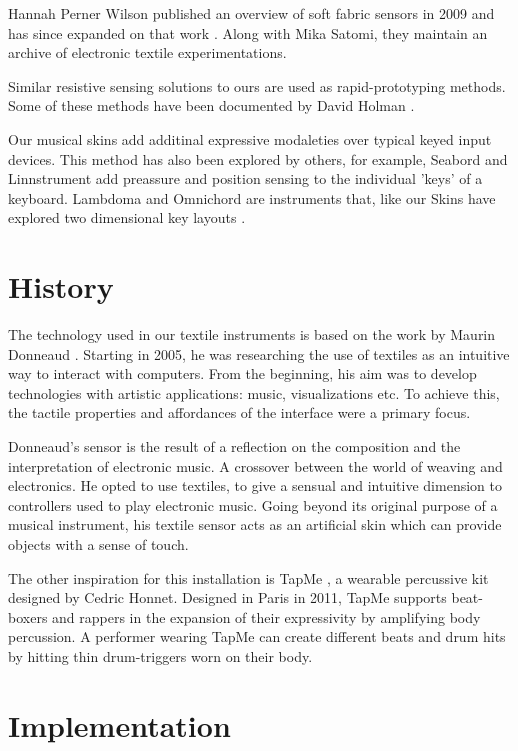 \documentclass{sigchi-ext}
\begin{document}
Hannah Perner Wilson published an overview of soft fabric sensors in 2009 \cite{perner-wilson:09} and has since expanded on that work \cite{perner-wilson:10}. Along with Mika Satomi, they maintain an archive of electronic textile experimentations\cite{kobakant}.

Similar resistive sensing solutions to ours are used as rapid-prototyping methods. Some of these methods have been documented by David Holman \cite{holman:14, holman:11}.

Our musical skins add additinal expressive modaleties over typical keyed input devices. This method has also been explored by others, for example, Seabord and Linnstrument \cite{seaboard, linnstrument} add preassure and position sensing to the individual 'keys' of a keyboard. Lambdoma and Omnichord are instruments that, like our Skins have explored two dimensional key layouts \cite{lambdoma, omnichord}.


\section{History}
The technology used in our textile instruments is based on the work by Maurin Donneaud \cite{donneaud}. Starting in 2005, he was researching the use of textiles as an intuitive way to interact with computers. From the beginning, his aim was to develop technologies with artistic applications: music, visualizations etc. To achieve this, the tactile properties and affordances of the interface were a primary focus.

Donneaud's sensor is the result of a reflection on the composition and the interpretation of electronic music. A crossover between the world of weaving and electronics. He opted to use textiles, to give a sensual and intuitive dimension to controllers used to play electronic music. Going beyond its original purpose of a musical instrument, his textile sensor acts as an artificial skin which can provide objects with a sense of touch.

The other inspiration for this installation is TapMe \cite{tapme}, a wearable percussive kit designed by Cedric Honnet. Designed in Paris in 2011, TapMe supports beat-boxers and rappers in the expansion of their expressivity by amplifying body percussion. A performer wearing TapMe can create different beats and drum hits by hitting thin drum-triggers worn on their body.


\section{Implementation}
\end{document}
